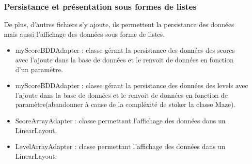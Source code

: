 \documentclass{article}
\begin{document}
\subsubsection{Persistance et présentation sous formes de listes}
De plus, d'autres fichiers s'y ajoute, ils permettent la persistance des données mais aussi l'affichage des données sous forme de listes.
\begin{itemize}
    \item myScoreBDDAdapter : classe gérant la persistance des données des scores avec l'ajoute dans la base de données et le renvoit de données en fonction d'un paramètre.
    \item myScoreBDDAdapter : classe gérant la persistance des données des levels avec l'ajoute dans la base de données et le renvoit de données en fonction de paramètre(abandonner à cause de la compléxité de stoker la classe Maze).
    \item ScoreArrayAdapter : classe permettant l'affichage des données dans un LinearLayout.
    \item LevelArrayAdapter : classe permettant l'affichage des données dans un LinearLayout.
\end{itemize}
\end{document}
